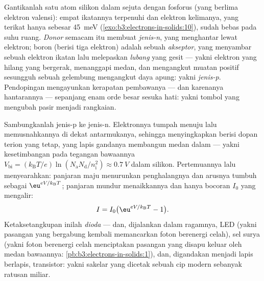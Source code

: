 \begin{definition}[Pendopingan]\label{def:b3:electrons-in-solids:doping}
Gantikanlah satu atom silikon dalam sejuta dengan fosforus (yang berlima
elektron valensi): empat ikatannya terpenuhi dan elektron kelimanya,
yang terikat hanya sebesar \qty{45}{meV}
(\cref{exo:b3:electrons-in-solids:10}), sudah bebas pada suhu
ruang. \emph{Donor} semacam itu membuat  \emph{jenis-n},
yang menghantar lewat elektron; boron (berisi tiga elektron)
adalah sebuah \emph{akseptor}, yang menyambar sebuah elektron ikatan lalu melepaskan
\emph{lubang} yang gesit --- yakni elektron yang hilang yang bergerak, menanggapi
medan, dan mengangkut muatan positif sesungguh sebuah gelembung
mengangkut daya apung: yakni \emph{jenis-p}. Pendopingan mengayunkan kerapatan pembawanya
--- dan karenanya hantarannya --- sepanjang enam orde besar sesuka
hati: yakni tombol yang mengubah pasir menjadi rangkaian.
\end{definition}

\begin{proposition}[Pertemuan p--n]\label{prop:b3:electrons-in-solids:junction}
Sambungkanlah jenis-p ke jenis-n. Elektronnya tumpah menuju  lalu
memusnahkannya di dekat antarmukanya, sehingga menyingkapkan \emph{} berisi dopan terion yang tetap, yang lapis gandanya membangun
medan dalam --- yakni kesetimbangan pada tegangan bawaannya
$V_{\text{bi}} = (k_{\text{B}}T/e)
\ln(N_{\text{a}}N_{\text{d}}/n_{\text{i}}^2) \approx
\qty{0.7}{V}$ dalam silikon. Pertemuannya lalu menyearahkan: panjaran
maju menurunkan penghalangnya dan arusnya tumbuh sebagai
$\eu^{eV/k_{\text{B}}T}$; panjaran mundur menaikkannya dan hanya
bocoran $I_0$ yang mengalir:
\[
I = I_0\big(\eu^{eV/k_{\text{B}}T} - 1\big) .
\]
Ketaksetangkupan inilah \emph{dioda} --- dan, dijalankan dalam
ragamnya, LED (yakni pasangan yang bergabung kembali memancarkan foton
berenergi celah), sel surya (yakni foton berenergi celah menciptakan
pasangan yang disapu keluar oleh medan bawaannya:
\cref{pb:b3:electrons-in-solids:1}), dan, digandakan menjadi lapis
berlapis, transistor: yakni sakelar yang dicetak sebuah cip modern
sebanyak ratusan miliar.
\end{proposition}
\admitted


